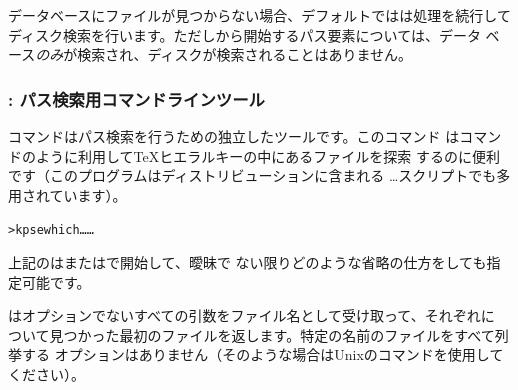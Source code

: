 \documentclass[uplatex,dvipdfmx,12pt,tombow]{jsarticle}
\begin{document}
データベースにファイルが見つからない場合、デフォルトでは\KPS は処理を続行して
ディスク検索を行います。ただし\samp{!!}から開始するパス要素については、データ
ベース\emph{のみ}が検索され、ディスクが検索されることはありません。

\subsubsection{: パス検索用コマンドラインツール}
\label{sec:invoking-kpsewhich}

コマンドはパス検索を行うための独立したツールです。このコマンド
はコマンドのように利用して\TeX ヒエラルキーの中にあるファイルを探索
するのに便利です（このプログラムはディストリビューションに含まれる%
\dots スクリプトでも多用されています）。
%
\begin{alltt}
> kpsewhich \dots{} \dots{}
\end{alltt}

上記のは\samp{\sopt{}}または\samp{\lopt{}}で開始して、曖昧で
ない限りどのような省略の仕方をしても指定可能です。

\KPS はオプションでないすべての引数をファイル名として受け取って、それぞれに
ついて見つかった最初のファイルを返します。特定の名前のファイルをすべて列挙する
オプションはありません（そのような場合はUnixのコマンドを使用して
ください）。
\end{document}
